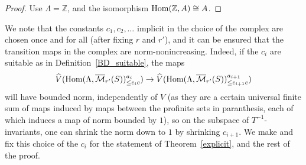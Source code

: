 \begin{proof}
  \leanok
  Use $\Lambda = \mathbb Z$, and the isomorphism $\operatorname{Hom}(\mathbb Z, A) \cong A$.
\end{proof}

We note that the constants $c_1,c_2,\ldots$ implicit in the choice of the complex
are chosen once and for all (after fixing $r$ and $r'$),
and it can be ensured that the transition maps in the complex are norm-nonincreasing.
Indeed, if the $c_i$ are suitable as in Definition~\ref{BD_suitable},
the maps
\[
\widehat{V}(\operatorname{Hom}(\Lambda,\overline{\mathcal M}_{r'}(S))_{\leq c_ic}^{a_i})\to \widehat{V}(\operatorname{Hom}(\Lambda,\overline{\mathcal M}_{r'}(S))_{\leq c_{i+1}c}^{a_{i+1}})
\]
will have bounded norm, independently of $V$ (as they are a certain universal finite sum of maps induced by maps between the profinite sets in paranthesis, each of which induces a map of norm bounded by $1$), so on the subspace of $T^{-1}$-invariants, one can shrink the norm down to $1$ by shrinking $c_{i+1}$. We make and fix this choice of the $c_i$ for the statement of Theorem~\ref{explicit}, and the rest of the proof.

